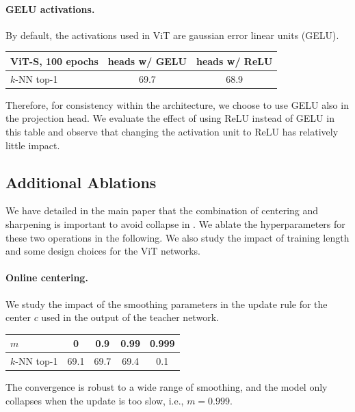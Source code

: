 \paragraph{GELU activations.}
By default, the activations used in ViT are gaussian error linear units (GELU).
\begin{table}[h!]
\vspace{-0.8em}
  \centering
  \begin{tabular}{@{}l c c@{}}
	  ViT-S, 100 epochs & heads w/ GELU & heads w/ ReLU \\
    \midrule
	  $k$-NN top-1 & \colorbox{Light}{69.7} & 68.9 \\
  \end{tabular}
\vspace{-0.8em}
\end{table}
Therefore, for consistency within the architecture, we choose to use GELU also in the projection head.
We evaluate the effect of using ReLU instead of GELU in this table and observe that changing the activation unit to ReLU has relatively little impact.


\subsection{Additional Ablations}
\label{ap:ablations}
We have detailed in the main paper that the combination of centering and sharpening is important to avoid collapse in \OURS.
We ablate the hyperparameters for these two operations in the following.
We also study the impact of training length and some design choices for the ViT networks.

\paragraph{Online centering.}
We study the impact of the smoothing parameters in the update rule for the center $c$ used in the output of the teacher network.
\begin{table}[h!]
\vspace{-0.8em}
  \centering
  \begin{tabular}{@{}l c c c c@{}}
	  $m$ & 0 & 0.9 & 0.99 & 0.999 \\
    \midrule
	  $k$-NN top-1 & 69.1 & \colorbox{Light}{69.7} & 69.4 & 0.1 \\
  \end{tabular}
\vspace{-0.8em}
\end{table}
The convergence is robust to a wide range of smoothing, and the model only collapses when the update is too slow, i.e., $m = 0.999$.

